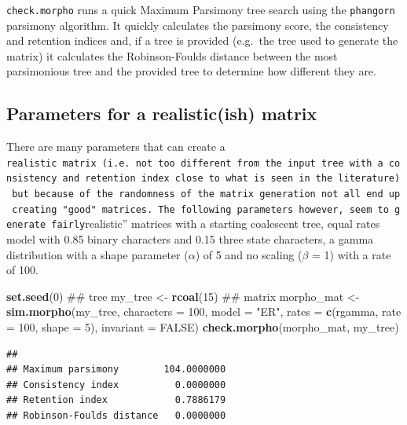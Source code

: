 \documentclass[]{book}
\newenvironment{Shaded}{\begin{snugshade}}{\end{snugshade}}
\newcommand{\KeywordTok}[1]{\textcolor[rgb]{0.13,0.29,0.53}{\textbf{#1}}}
\newcommand{\DataTypeTok}[1]{\textcolor[rgb]{0.13,0.29,0.53}{#1}}
\newcommand{\DecValTok}[1]{\textcolor[rgb]{0.00,0.00,0.81}{#1}}
\newcommand{\StringTok}[1]{\textcolor[rgb]{0.31,0.60,0.02}{#1}}
\newcommand{\OtherTok}[1]{\textcolor[rgb]{0.56,0.35,0.01}{#1}}
\newcommand{\NormalTok}[1]{#1}
\theoremstyle{definition}
\theoremstyle{definition}
\theoremstyle{remark}
\begin{document}
\texttt{check.morpho} runs a quick Maximum Parsimony tree search using
the \texttt{phangorn} parsimony algorithm. It quickly calculates the
parsimony score, the consistency and retention indices and, if a tree is
provided (e.g.~the tree used to generate the matrix) it calculates the
Robinson-Foulds distance between the most parsimonious tree and the
provided tree to determine how different they are.

\subsection{Parameters for a realistic(ish)
matrix}\label{parameters-for-a-realisticish-matrix}

There are many parameters that can create a
\texttt{realistic\textquotesingle{}\textquotesingle{}\ matrix\ (i.e.\ not\ too\ different\ from\ the\ input\ tree\ with\ a\ consistency\ and\ retention\ index\ close\ to\ what\ is\ seen\ in\ the\ literature)\ but\ because\ of\ the\ randomness\ of\ the\ matrix\ generation\ not\ all\ end\ up\ creating\ "good"\ matrices.\ The\ following\ parameters\ however,\ seem\ to\ generate\ fairly}realistic''
matrices with a starting coalescent tree, equal rates model with 0.85
binary characters and 0.15 three state characters, a gamma distribution
with a shape parameter (\(\alpha\)) of 5 and no scaling (\(\beta\) = 1)
with a rate of 100.

\begin{Shaded}
\begin{Highlighting}[]
\KeywordTok{set.seed}\NormalTok{(}\DecValTok{0}\NormalTok{)}
\NormalTok{## tree}
\NormalTok{my_tree <-}\StringTok{ }\KeywordTok{rcoal}\NormalTok{(}\DecValTok{15}\NormalTok{)}
\NormalTok{## matrix}
\NormalTok{morpho_mat <-}\StringTok{ }\KeywordTok{sim.morpho}\NormalTok{(my_tree, }\DataTypeTok{characters =} \DecValTok{100}\NormalTok{, }\DataTypeTok{model =} \StringTok{"ER"}\NormalTok{,}
    \DataTypeTok{rates =} \KeywordTok{c}\NormalTok{(rgamma, }\DataTypeTok{rate =} \DecValTok{100}\NormalTok{, }\DataTypeTok{shape =} \DecValTok{5}\NormalTok{), }\DataTypeTok{invariant =} \OtherTok{FALSE}\NormalTok{)}
\KeywordTok{check.morpho}\NormalTok{(morpho_mat, my_tree)}
\end{Highlighting}
\end{Shaded}

\begin{verbatim}
##                                     
## Maximum parsimony        104.0000000
## Consistency index          0.0000000
## Retention index            0.7886179
## Robinson-Foulds distance   0.0000000
\end{verbatim}
\end{document}
